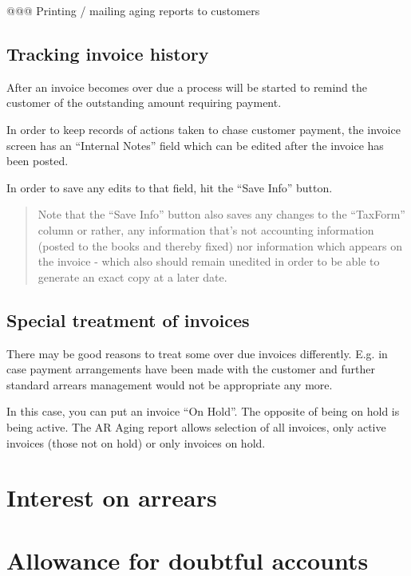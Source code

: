 @@@ Printing / mailing aging reports to customers


\subsection{Tracking invoice history}
\label{subsec-business-processes-credit-risk-arrears-reminding}

After an invoice becomes over due a process will be started to remind
the \gls{customer} of the outstanding amount requiring payment.

In order to keep records of actions taken to chase customer payment,
the invoice screen has an ``Internal Notes'' field which can be edited
after the invoice has been posted.

In order to save any edits to that field, hit the ``Save Info'' button.

\begin{quotation}
Note that the ``Save Info'' button also saves any changes to the ``TaxForm'' column or
rather, any information that's not accounting information (posted to the books and
thereby fixed) nor information which appears on the invoice - which also should remain
unedited in order to be able to generate an exact copy at a later date.
\end{quotation}


\subsection{Special treatment of invoices}
\label{subsec-business-processes-credit-risk-arrears-special-treatment}

There may be good reasons to treat some over due invoices differently. E.g. in case
payment arrangements have been made with the \gls{customer} and further standard arrears
management would not be appropriate any more.

In this case, you can put an invoice ``On Hold''. The opposite of being on hold is
being active. The AR Aging report allows selection of all invoices, only active
invoices (those not on hold) or only invoices on hold.


\section{Interest on arrears}
\label{sec-business-processes-credit-risk-interest-on-arrears}

\section{Allowance for doubtful accounts}
\label{sec-business-processes-credit-risk-allowance-doubtful-accounts}


